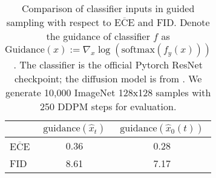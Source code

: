 \documentclass{article}
\theoremstyle{definition}
\begin{document}
\begin{table}[h!]
\caption{Comparison of classifier inputs in guided sampling with respect to $\overline{\text{ECE}}$ and FID. Denote the guidance of classifier $f$ as $\text{Guidance}(x) := \nabla_{x}\log(\text{softmax}(f_y(x)))$. The classifier is the official Pytorch ResNet checkpoint; the diffusion model is from \cite{dhariwal2021diffusion}. We generate 10,000 ImageNet 128x128 samples with 250 DDPM steps for evaluation.}
\label{table:compare_xt_x0}
\begin{center}
\begin{small}
\begin{sc}
\begin{tabular}{lcc}
\toprule
     & $\text{guidance}(\hat{x}_t)$ & $\text{guidance}(\hat{x}_0(t))$ \\
\midrule     
$\overline{\text{ECE}}$          &  0.36 &  0.28\\
FID          &  8.61 &  7.17\\
\bottomrule
\end{tabular}
\end{sc}
\end{small}
\end{center}
\end{table}
\end{document}
